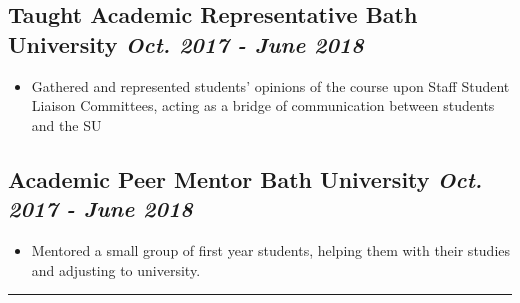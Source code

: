 \documentclass[11pt,a4paper]{report}
\begin{document}
	\subsection*{
			Taught Academic Representative
			\hfill\normalfont Bath University
			\hfill\normalfont\emph{ Oct. 2017 - June 2018 }
		}

		\begin{itemize}
			\item Gathered and represented students' opinions of the course upon Staff Student Liaison Committees,
						acting as a bridge of communication between students and the SU
		\end{itemize}

	\subsection*{
			Academic Peer Mentor
			\hspace{0.8in}\hfill\normalfont Bath University 
			\hfill\normalfont\emph{ Oct. 2017 - June 2018 }
		}

		\begin{itemize}
			\item Mentored a small group of first year students, helping them with their studies and adjusting to university.
		\end{itemize}

\hrule\vspace{0.175in}
\end{document}

